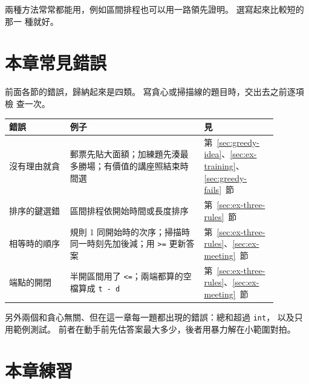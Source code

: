 兩種方法常常都能用，例如區間排程也可以用一路領先證明。 選寫起來比較短的那一
種就好。

\section{本章常見錯誤}
\label{sec:greedy-pitfalls}

前面各節的錯誤，歸納起來是四類。 寫貪心或掃描線的題目時，交出去之前逐項檢
查一次。

\begin{center}
\begin{tabular}{p{0.2\linewidth}p{0.44\linewidth}p{0.24\linewidth}}
\toprule
錯誤 & 例子 & 見 \\
\midrule
沒有理由就貪 & 郵票先貼大面額；加練題先湊最多勝場；有價值的講座照結束時間選 &
第~\ref{sec:greedy-idea}、\ref{sec:ex-training}、\ref{sec:greedy-fails}~節 \\
排序的鍵選錯 & 區間排程依開始時間或長度排序 & 第~\ref{sec:ex-three-rules}~節 \\
相等時的順序 & 規則 1 同開始時的次序；掃描時同一時刻先加後減；用
\texttt{>=} 更新答案 & 第~\ref{sec:ex-three-rules}、\ref{sec:ex-meeting}~節 \\
端點的開閉 & 半開區間用了 \texttt{<=}；兩端都算的空檔算成 \texttt{t - d} &
第~\ref{sec:ex-three-rules}、\ref{sec:ex-meeting}~節 \\
\bottomrule
\end{tabular}
\end{center}

另外兩個和貪心無關、但在這一章每一題都出現的錯誤：總和超過 \texttt{int}，
以及只用範例測試。 前者在動手前先估答案最大多少，後者用暴力解在小範圍對拍。

\section{本章練習}
\label{sec:ch7-exercises}

